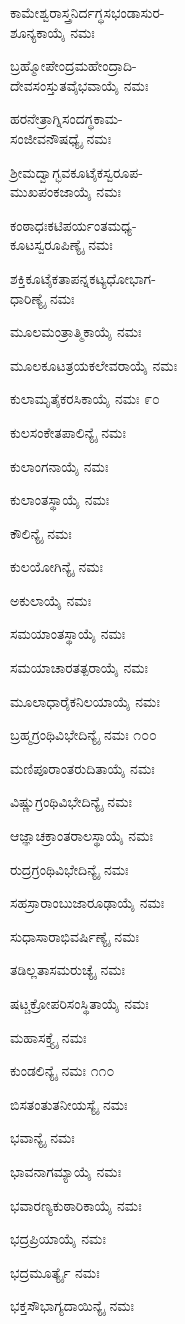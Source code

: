 ಕಾಮೇಶ್ವರಾಸ್ತ್ರನಿರ್ದಗ್ಧಸಭಂಡಾಸುರ-\\ಶೂನ್ಯಕಾಯೈ ನಮಃ

ಬ್ರಹ್ಮೋಪೇಂದ್ರಮಹೇಂದ್ರಾದಿ-\\ದೇವಸಂಸ್ತುತವೈಭವಾಯೈ ನಮಃ

ಹರನೇತ್ರಾಗ್ನಿಸಂದಗ್ಧಕಾಮ-\\ಸಂಜೀವನೌಷಧ್ಯೈ ನಮಃ

ಶ್ರೀಮದ್ವಾಗ್ಭವಕೂಟೈಕಸ್ವರೂಪ-\\ಮುಖಪಂಕಜಾಯೈ ನಮಃ

ಕಂಠಾಧಃಕಟಿಪರ್ಯಂತಮಧ್ಯ-\\ಕೂಟಸ್ವರೂಪಿಣ್ಯೈ ನಮಃ

ಶಕ್ತಿಕೂಟೈಕತಾಪನ್ನಕಟ್ಯಧೋಭಾಗ-\\ಧಾರಿಣ್ಯೈ ನಮಃ

ಮೂಲಮಂತ್ರಾತ್ಮಿಕಾಯೈ ನಮಃ

ಮೂಲಕೂಟತ್ರಯಕಲೇವರಾಯೈ ನಮಃ

ಕುಲಾಮೃತೈಕರಸಿಕಾಯೈ ನಮಃ \num{೯೦}

ಕುಲಸಂಕೇತಪಾಲಿನ್ಯೈ ನಮಃ

ಕುಲಾಂಗನಾಯೈ ನಮಃ

ಕುಲಾಂತಸ್ಥಾಯೈ ನಮಃ

ಕೌಲಿನ್ಯೈ ನಮಃ

ಕುಲಯೋಗಿನ್ಯೈ ನಮಃ

ಅಕುಲಾಯೈ ನಮಃ

ಸಮಯಾಂತಸ್ಥಾಯೈ ನಮಃ

ಸಮಯಾಚಾರತತ್ಪರಾಯೈ ನಮಃ

ಮೂಲಾಧಾರೈಕನಿಲಯಾಯೈ ನಮಃ

ಬ್ರಹ್ಮಗ್ರಂಥಿವಿಭೇದಿನ್ಯೈ ನಮಃ \num{೧೦೦}

ಮಣಿಪೂರಾಂತರುದಿತಾಯೈ ನಮಃ

ವಿಷ್ಣುಗ್ರಂಥಿವಿಭೇದಿನ್ಯೈ ನಮಃ

ಆಜ್ಞಾಚಕ್ರಾಂತರಾಲಸ್ಥಾಯೈ ನಮಃ

ರುದ್ರಗ್ರಂಥಿವಿಭೇದಿನ್ಯೈ ನಮಃ

ಸಹಸ್ರಾರಾಂಬುಜಾರೂಢಾಯೈ ನಮಃ

ಸುಧಾಸಾರಾಭಿವರ್ಷಿಣ್ಯೈ ನಮಃ

ತಡಿಲ್ಲತಾಸಮರುಚ್ಯೈ ನಮಃ

ಷಟ್ಚಕ್ರೋಪರಿಸಂಸ್ಥಿತಾಯೈ ನಮಃ

ಮಹಾಸಕ್ತ್ಯೈ ನಮಃ

ಕುಂಡಲಿನ್ಯೈ ನಮಃ \num{೧೧೦}

ಬಿಸತಂತುತನೀಯಸ್ಯೈ ನಮಃ

ಭವಾನ್ಯೈ ನಮಃ

ಭಾವನಾಗಮ್ಯಾಯೈ ನಮಃ

ಭವಾರಣ್ಯಕುಠಾರಿಕಾಯೈ ನಮಃ

ಭದ್ರಪ್ರಿಯಾಯೈ ನಮಃ

ಭದ್ರಮೂರ್ತ್ಯೈ ನಮಃ

ಭಕ್ತಸೌಭಾಗ್ಯದಾಯಿನ್ಯೈ ನಮಃ

